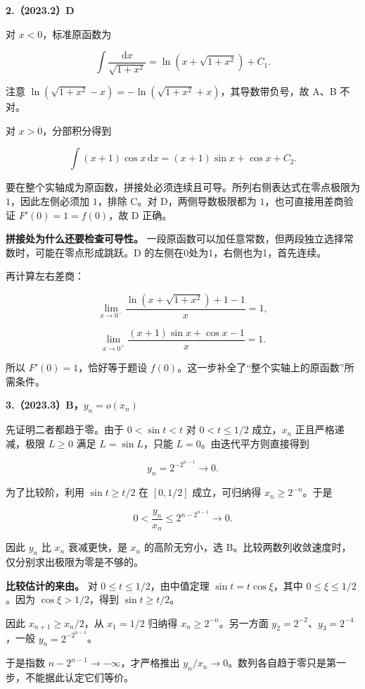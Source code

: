 \documentclass[UTF8,11pt,fontset=windows]{ctexart}
\begin{document}
\clearpage

\textbf{2.（2023.2）D}

对 $x<0$，标准原函数为

$$
\int\frac{\mathrm dx}{\sqrt{1+x^2}}=\ln\left(x+\sqrt{1+x^2}\right)+C_1.
$$

注意 $\ln(\sqrt{1+x^2}-x)=-\ln(\sqrt{1+x^2}+x)$，其导数带负号，故 A、B 不对。

对 $x>0$，分部积分得到

$$
\int(x+1)\cos x\,\mathrm dx=(x+1)\sin x+\cos x+C_2.
$$

要在整个实轴成为原函数，拼接处必须连续且可导。所列右侧表达式在零点极限为 $1$，因此左侧必须加 $1$，排除 C。对 D，两侧导数极限都为 $1$，也可直接用差商验证 $F'(0)=1=f(0)$，故 D 正确。

\textbf{拼接处为什么还要检查可导性。} 一段原函数可以加任意常数，但两段独立选择常数时，可能在零点形成跳跃。D 的左侧在0处为1，右侧也为1，首先连续。

再计算左右差商：

$$
\lim_{x\to0^-}\frac{\ln(x+\sqrt{1+x^2})+1-1}{x}=1,
$$

$$
\lim_{x\to0^+}\frac{(x+1)\sin x+\cos x-1}{x}=1.
$$

所以 $F'(0)=1$，恰好等于题设 $f(0)$。这一步补全了“整个实轴上的原函数”所需条件。

\clearpage

\textbf{3.（2023.3）B，$y_n=o(x_n)$}

先证明二者都趋于零。由于 $0<\sin t<t$ 对 $0<t\le1/2$ 成立，$x_n$ 正且严格递减，极限 $L\ge0$ 满足 $L=\sin L$，只能 $L=0$。由迭代平方则直接得到

$$
y_n=2^{-2^{n-1}}\longrightarrow0.
$$

为了比较阶，利用 $\sin t\ge t/2$ 在 $[0,1/2]$ 成立，可归纳得 $x_n\ge2^{-n}$。于是

$$
0<\frac{y_n}{x_n}\le2^{n-2^{n-1}}\longrightarrow0.
$$

因此 $y_n$ 比 $x_n$ 衰减更快，是 $x_n$ 的高阶无穷小，选 B。比较两数列收敛速度时，仅分别求出极限为零是不够的。

\textbf{比较估计的来由。} 对 $0\le t\le1/2$，由中值定理 $\sin t=t\cos\xi$，其中 $0\le\xi\le1/2$。因为 $\cos\xi>1/2$，得到 $\sin t\ge t/2$。

因此 $x_{n+1}\ge x_n/2$，从 $x_1=1/2$ 归纳得 $x_n\ge2^{-n}$。另一方面 $y_2=2^{-2}$、$y_3=2^{-4}$，一般 $y_n=2^{-2^{n-1}}$。

于是指数 $n-2^{n-1}\to-\infty$，才严格推出 $y_n/x_n\to0$。数列各自趋于零只是第一步，不能据此认定它们等价。
\end{document}
